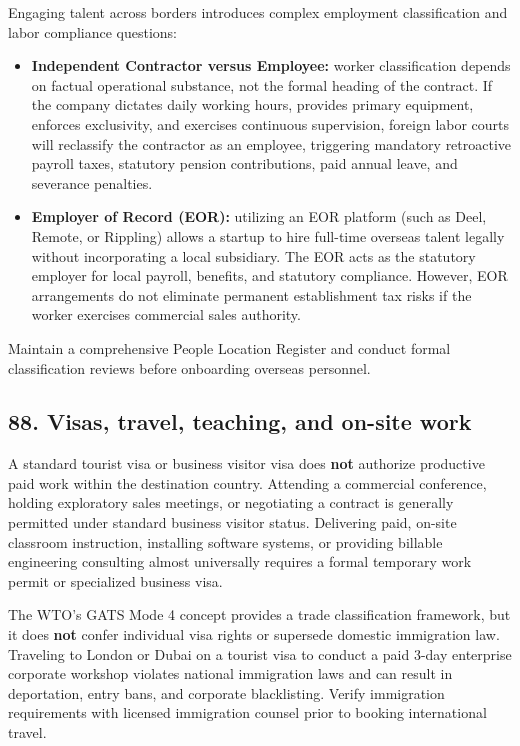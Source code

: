 Engaging talent across borders introduces complex employment classification and labor compliance questions:
\begin{itemize}
    \item \textbf{Independent Contractor versus Employee:} worker classification depends on factual operational substance, not the formal heading of the contract. If the company dictates daily working hours, provides primary equipment, enforces exclusivity, and exercises continuous supervision, foreign labor courts will reclassify the contractor as an employee, triggering mandatory retroactive payroll taxes, statutory pension contributions, paid annual leave, and severance penalties.
    \item \textbf{Employer of Record (EOR):} utilizing an EOR platform (such as Deel, Remote, or Rippling) allows a startup to hire full-time overseas talent legally without incorporating a local subsidiary. The EOR acts as the statutory employer for local payroll, benefits, and statutory compliance. However, EOR arrangements do not eliminate permanent establishment tax risks if the worker exercises commercial sales authority.
\end{itemize}
Maintain a comprehensive People Location Register and conduct formal classification reviews before onboarding overseas personnel.

\subsection{88. Visas, travel, teaching, and on-site work}

A standard tourist visa or business visitor visa does \textbf{not} authorize productive paid work within the destination country. Attending a commercial conference, holding exploratory sales meetings, or negotiating a contract is generally permitted under standard business visitor status. Delivering paid, on-site classroom instruction, installing software systems, or providing billable engineering consulting almost universally requires a formal temporary work permit or specialized business visa.

The WTO's GATS Mode 4 concept provides a trade classification framework, but it does \textbf{not} confer individual visa rights or supersede domestic immigration law. Traveling to London or Dubai on a tourist visa to conduct a paid 3-day enterprise corporate workshop violates national immigration laws and can result in deportation, entry bans, and corporate blacklisting. Verify immigration requirements with licensed immigration counsel prior to booking international travel.

